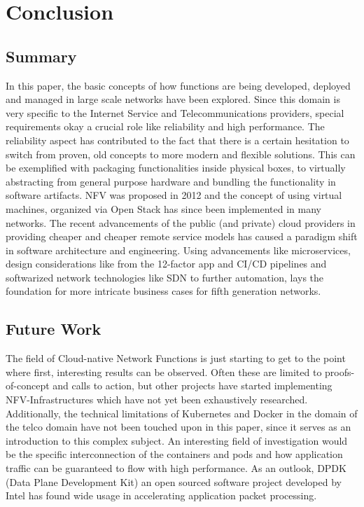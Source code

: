 \section{Conclusion}

\subsection{Summary}
In this paper, the basic concepts of how functions are being developed, deployed and managed in large scale networks have been explored. Since this domain is very specific to the Internet Service and Telecommunications providers, special requirements okay a crucial role like reliability and high performance. The reliability aspect has contributed to the fact that there is a certain hesitation to switch from proven, old concepts to more modern and flexible solutions. This can be exemplified with packaging functionalities inside physical boxes, to virtually abstracting from general purpose hardware and bundling the functionality in software artifacts. NFV was proposed in 2012 and the concept of using virtual machines, organized via Open Stack has since been implemented in many networks. The recent advancements of the public (and private) cloud providers in providing cheaper and cheaper remote service models has caused a paradigm shift in software architecture and engineering. Using advancements like microservices, design considerations like from the 12-factor app and CI/CD pipelines and softwarized network technologies like SDN to further automation, lays the foundation for more intricate business cases for fifth generation networks.

\subsection{Future Work}
The field of Cloud-native Network Functions is just starting to get to the point where first, interesting results can be observed. Often these are limited to proofs-of-concept and calls to action, but other projects have started implementing NFV-Infrastructures which have not yet been exhaustively researched. Additionally, the technical limitations of Kubernetes and Docker in the domain of the telco domain have not been touched upon in this paper, since it serves as an introduction to this complex subject. An interesting field of investigation would be the specific interconnection of the containers and pods and how application traffic can be guaranteed to flow with high performance. As an outlook, DPDK (Data Plane Development Kit) an open sourced software project developed by Intel has found wide usage in accelerating application packet processing.